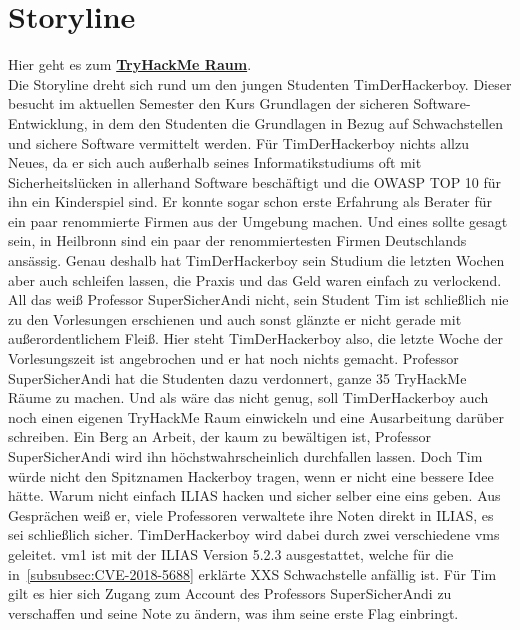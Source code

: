 \documentclass[10pt, a4paper,onecolumn ,titlepage]{article}
\begin{document}
    \section{Storyline}
    \label{sec:storyline}
    Hier geht es zum \href{https://tryhackme.com/room/t1mth3h4ck3rb0y}{\textbf{TryHackMe Raum}}.\vspace{0.5cm}
    \\
    Die Storyline dreht sich rund um den jungen Studenten TimDerHackerboy.
    Dieser besucht im aktuellen Semester den Kurs \glqq Grundlagen der sicheren Software-Entwicklung\grqq, in dem den Studenten die Grundlagen in Bezug auf Schwachstellen und sichere Software vermittelt werden.
    Für TimDerHackerboy nichts allzu Neues, da er sich auch außerhalb seines Informatikstudiums oft mit Sicherheitslücken in allerhand Software beschäftigt und die OWASP TOP 10 für ihn ein Kinderspiel sind.
    Er konnte sogar schon erste Erfahrung als Berater für ein paar renommierte Firmen aus der Umgebung machen.
    Und eines sollte gesagt sein, in Heilbronn sind ein paar der renommiertesten Firmen Deutschlands ansässig.
    Genau deshalb hat TimDerHackerboy sein Studium die letzten Wochen aber auch schleifen lassen, die Praxis und das Geld waren einfach zu verlockend.
    All das weiß Professor SuperSicherAndi nicht, sein Student Tim ist schließlich nie zu den Vorlesungen erschienen und auch sonst glänzte er nicht gerade mit außerordentlichem Fleiß.
    Hier steht TimDerHackerboy also, die letzte Woche der Vorlesungszeit ist angebrochen und er hat noch nichts gemacht.
    Professor SuperSicherAndi hat die Studenten dazu verdonnert, ganze 35 TryHackMe Räume zu machen.
    Und als wäre das nicht genug, soll TimDerHackerboy auch noch einen eigenen TryHackMe Raum einwickeln und eine Ausarbeitung darüber schreiben.
    Ein Berg an Arbeit, der kaum zu bewältigen ist, Professor SuperSicherAndi wird ihn höchstwahrscheinlich durchfallen lassen.
    Doch Tim würde nicht den Spitznamen Hackerboy tragen, wenn er nicht eine bessere Idee hätte.
    Warum nicht einfach ILIAS hacken und sicher selber eine eins geben.
    Aus Gesprächen weiß er, viele Professoren verwaltete ihre Noten direkt in ILIAS, es sei schließlich sicher.
    TimDerHackerboy wird dabei durch zwei verschiedene \ac{vm}s geleitet.
    \ac{vm}1 ist mit der ILIAS Version 5.2.3 ausgestattet, welche für die in~\ref{subsubsec:CVE-2018-5688} erklärte XXS Schwachstelle anfällig ist.
    Für Tim gilt es hier sich Zugang zum Account des Professors SuperSicherAndi zu verschaffen und seine Note zu ändern, was ihm seine erste Flag einbringt.
\end{document}
